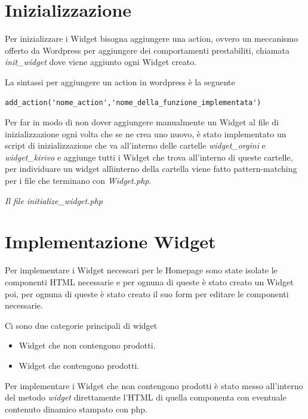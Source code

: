 \newpage

\section{Inizializzazione}
Per inizializzare i Widget bisogna aggiungere una action\cite{WPACTION}, ovvero un meccanismo offerto da Wordpress per aggiungere dei comportamenti
prestabiliti,  chiamata \emph{init\_widget} dove viene aggiunto ogni Widget creato.

La sintassi per aggiungere un action in wordpress è la seguente
\begin{verbatim}
add_action('nome_action','nome_della_funzione_implementata')
\end{verbatim}

Per far in modo di non dover aggiungere manualmente un Widget al file di inizializzazione ogni volta che se ne crea uno nuovo, è
stato implementato un script di inizializzazione che va all'interno delle cartelle \emph{widget\_orgini} e \emph{widget\_kirivo} e aggiunge tutti
i Widget che trova all'interno di queste cartelle, per individuare un widget allìinterno della cartella viene fatto pattern-matching per i file che terminano con \emph{Widget.php}.


\emph{Il file initialize\_widget.php}

\section{Implementazione Widget}
Per implementare i Widget necessari per le Homepage sono state isolate le componenti HTML necessarie e per ognuna
di queste è stato creato un Widget poi, per ognuna di queste è stato creato il suo form per editare le componenti necessarie.

Ci sono due categorie principali di widget
\begin{itemize}
\item Widget che non contengono prodotti.
\item Widget che contengono prodotti.
\end{itemize}

Per implementare i Widget che non contengono prodotti è stato messo all'interno del metodo \emph{widget} direttamente
l'HTML di quella componenta con eventuale contenuto dinamico stampato con php.


